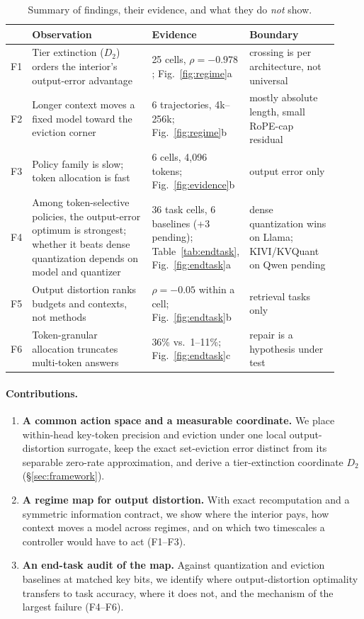 \documentclass{article}
\theoremstyle{definition}
\begin{document}
\begin{table}[t]
\centering
\small
\setlength{\tabcolsep}{4pt}
\caption{Summary of findings, their evidence, and what they do \emph{not} show.}
\label{tab:findings}
\begin{tabular}{@{}p{0.03\linewidth}p{0.40\linewidth}p{0.20\linewidth}p{0.29\linewidth}@{}}
\toprule
& \textbf{Observation} & \textbf{Evidence} & \textbf{Boundary} \\
\midrule
F1 & Tier extinction ($D_2$) orders the interior's output-error advantage & 25 cells, $\rho=-0.978$; Fig.~\ref{fig:regime}a & crossing is per architecture, not universal \\
F2 & Longer context moves a fixed model toward the eviction corner & 6 trajectories, 4k--256k; Fig.~\ref{fig:regime}b & mostly absolute length, small RoPE-cap residual \\
F3 & Policy family is slow; token allocation is fast & 6 cells, 4,096 tokens; Fig.~\ref{fig:evidence}b & output error only \\
F4 & Among token-selective policies, the output-error optimum is strongest; whether it beats dense quantization depends on model and quantizer & 36 task cells, 6 baselines (+3 pending); Table~\ref{tab:endtask}, Fig.~\ref{fig:endtask}a & dense quantization wins on Llama; KIVI/KVQuant on Qwen pending \\
F5 & Output distortion ranks budgets and contexts, not methods & $\rho=-0.05$ within a cell; Fig.~\ref{fig:endtask}b & retrieval tasks only \\
F6 & Token-granular allocation truncates multi-token answers & 36\% vs.\ 1--11\%; Fig.~\ref{fig:endtask}c & repair is a hypothesis under test \\
\bottomrule
\end{tabular}
\vspace{-2mm}
\end{table}

\paragraph{Contributions.}
\begin{enumerate}[leftmargin=*,itemsep=1pt,topsep=2pt]
  \item \textbf{A common action space and a measurable coordinate.} We place within-head key-token precision and eviction under one local output-distortion surrogate, keep the exact set-eviction error distinct from its separable zero-rate approximation, and derive a tier-extinction coordinate $D_2$ (\S\ref{sec:framework}).
  \item \textbf{A regime map for output distortion.} With exact recomputation and a symmetric information contract, we show where the interior pays, how context moves a model across regimes, and on which two timescales a controller would have to act (F1--F3).
  \item \textbf{An end-task audit of the map.} Against quantization and eviction baselines at matched key bits, we identify where output-distortion optimality transfers to task accuracy, where it does not, and the mechanism of the largest failure (F4--F6).
\end{enumerate}
\end{document}
